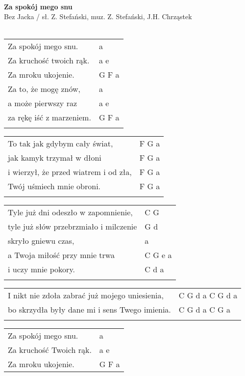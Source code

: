 \documentclass[a5paper]{article}
\begin{document}


\noindent
\fontsize{12pt}{15pt}\selectfont
\textbf{Za spokój mego snu} \\
\fontsize{8pt}{10pt}\selectfont
Bez Jacka / sł. Z. Stefański, muz. Z. Stefański, J.H. Chrząstek \\ \\
\fontsize{10pt}{12pt}\selectfont
{}
\begin{tabular}{@{}p{7.50cm}p{3cm}@{}}
\noindent
Za spokój mego snu. & a \\
Za kruchość twoich rąk. & a e \\
Za mroku ukojenie. & G F a \\
Za to, że mogę znów, & a \\
a może pierwszy raz & a e \\
za rękę iść z marzeniem. & G F a \\ \\ 
\end{tabular}

\noindent
\begin{tabular}{@{}p{7.50cm}p{3cm}@{}}
To tak jak gdybym cały świat, & F G a \\
jak kamyk trzymał w dłoni & F G a \\
i wierzył, że przed wiatrem i od zła, & F G a \\
Twój uśmiech mnie obroni. & F G a \\ \\
\end{tabular}

\noindent
\begin{tabular}{@{}p{7.50cm}p{3cm}@{}}
Tyle już dni odeszło w zapomnienie, & C G \\
tyle już słów przebrzmiało i milczenie & G d \\
skryło gniewu czas, & a \\
a Twoja miłość przy mnie trwa & C G e a \\
i uczy mnie pokory. & C d a \\ \\
\end{tabular}

\noindent
\begin{tabular}{@{}p{7.50cm}p{3cm}@{}}
I nikt nie zdoła zabrać już mojego uniesienia, & C G d a C G d a \\
bo skrzydła były dane mi i sens Twego imienia. & C G d a C G a \\ \\
\end{tabular}

\noindent
\begin{tabular}{@{}p{7.50cm}p{3cm}@{}}
Za spokój mego snu. & a \\
Za kruchość Twoich rąk. & a e \\
Za mroku ukojenie. & G F a
\end{tabular}
\end{document}
